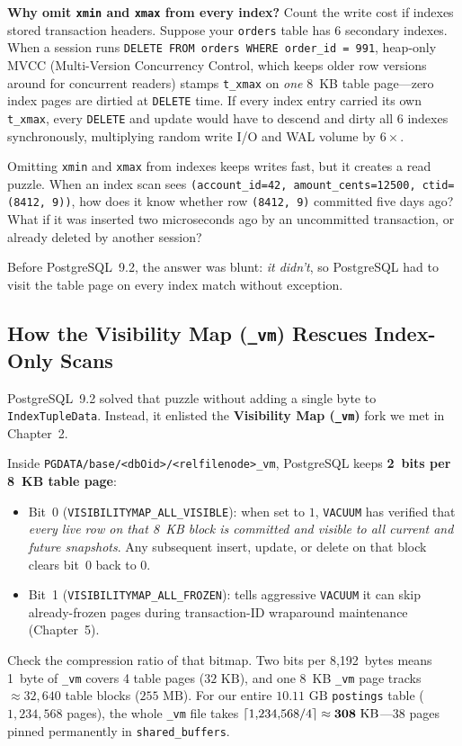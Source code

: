\begin{intuitionbox}
\textbf{Why omit \texttt{xmin} and \texttt{xmax} from every index?} Count the write cost if indexes stored transaction headers. Suppose your \texttt{orders} table has 6 secondary indexes. When a session runs \texttt{DELETE FROM orders WHERE order\_id = 991}, heap-only MVCC (Multi-Version Concurrency Control, which keeps older row versions around for concurrent readers) stamps \texttt{t\_xmax} on \emph{one} 8~KB table page---zero index pages are dirtied at \texttt{DELETE} time. If every index entry carried its own \texttt{t\_xmax}, every \texttt{DELETE} and update would have to descend and dirty all 6 indexes synchronously, multiplying random write I/O and WAL volume by $6\times$.
\end{intuitionbox}

Omitting \texttt{xmin} and \texttt{xmax} from indexes keeps writes fast, but it creates a read puzzle. When an index scan sees \texttt{(account\_id=42, amount\_cents=12500, ctid=(8412, 9))}, how does it know whether row \texttt{(8412, 9)} committed five days ago? What if it was inserted two microseconds ago by an uncommitted transaction, or already deleted by another session?

Before PostgreSQL~9.2, the answer was blunt: \emph{it didn't}, so PostgreSQL had to visit the table page on every index match without exception.

\subsection{How the Visibility Map (\texttt{\_vm}) Rescues Index-Only Scans}

PostgreSQL~9.2 solved that puzzle without adding a single byte to \texttt{IndexTupleData}. Instead, it enlisted the \textbf{Visibility Map (\texttt{\_vm})} fork we met in Chapter~2.

Inside \texttt{PGDATA/base/<dbOid>/<relfilenode>\_vm}, PostgreSQL keeps \textbf{2~bits per 8~KB table page}:
\begin{itemize}
  \item Bit~0 (\texttt{VISIBILITYMAP\_ALL\_VISIBLE}): when set to $1$, \texttt{VACUUM} has verified that \emph{every live row on that 8~KB block is committed and visible to all current and future snapshots}. Any subsequent insert, update, or delete on that block clears bit~0 back to $0$.
  \item Bit~1 (\texttt{VISIBILITYMAP\_ALL\_FROZEN}): tells aggressive \texttt{VACUUM} it can skip already-frozen pages during transaction-ID wraparound maintenance (Chapter~5).
\end{itemize}
Check the compression ratio of that bitmap. Two bits per 8,192~bytes means 1~byte of \texttt{\_vm} covers 4 table pages ($32\text{ KB}$), and one 8~KB \texttt{\_vm} page tracks $\approx 32{,}640$ table blocks ($255\text{ MB}$). For our entire $10.11\text{ GB}$ \texttt{postings} table ($1{,}234{,}568$ pages), the whole \texttt{\_vm} file takes $\lceil1{,}234{,}568 / 4\rceil \approx \mathbf{308\text{ KB}}$---38 pages pinned permanently in \texttt{shared\_buffers}.

